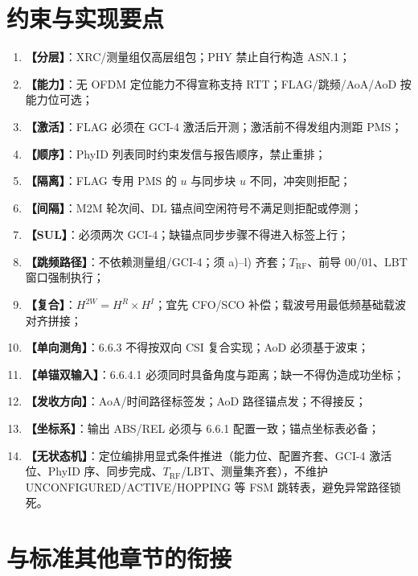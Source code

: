 \documentclass[11pt,a4paper]{ctexart}
\begin{document}


\section{约束与实现要点}

\begin{enumerate}[label=\textbf{C\arabic*.}, leftmargin=*, itemsep=0.35em]
  \item \textbf{【分层】}：XRC/测量组仅高层组包；PHY 禁止自行构造 ASN.1；
  \item \textbf{【能力】}：无 OFDM 定位能力不得宣称支持 RTT；FLAG/跳频/AoA/AoD 按能力位可选；
  \item \textbf{【激活】}：FLAG 必须在 GCI-4 激活后开测；激活前不得发组内测距 PMS；
  \item \textbf{【顺序】}：PhyID 列表同时约束发信与报告顺序，禁止重排；
  \item \textbf{【隔离】}：FLAG 专用 PMS 的 $u$ 与同步块 $u$ 不同，冲突则拒配；
  \item \textbf{【间隔】}：M2M 轮次间、DL 锚点间空闲符号不满足则拒配或停测；
  \item \textbf{【SUL】}：必须两次 GCI-4；缺锚点同步步骤不得进入标签上行；
  \item \textbf{【跳频路径】}：不依赖测量组/GCI-4；须 a)--l) 齐套；$T_{\mathrm{RF}}$、前导 00/01、LBT 窗口强制执行；
  \item \textbf{【复合】}：$H^{2W}{=}H^{R}\times H^{I}$；宜先 CFO/SCO 补偿；载波号用最低频基础载波对齐拼接；
  \item \textbf{【单向测角】}：6.6.3 不得按双向 CSI 复合实现；AoD 必须基于波束；
  \item \textbf{【单锚双输入】}：6.6.4.1 必须同时具备角度与距离；缺一不得伪造成功坐标；
  \item \textbf{【发收方向】}：AoA/时间路径标签发；AoD 路径锚点发；不得接反；
  \item \textbf{【坐标系】}：输出 ABS/REL 必须与 6.6.1 配置一致；锚点坐标表必备；
  \item \textbf{【无状态机】}：定位编排用显式条件推进（能力位、配置齐套、GCI-4 激活位、PhyID 序、同步完成、$T_{\mathrm{RF}}$/LBT、测量集齐套），不维护 UNCONFIGURED/ACTIVE/HOPPING 等 FSM 跳转表，避免异常路径锁死。
\end{enumerate}



\section{与标准其他章节的衔接}
\end{document}
